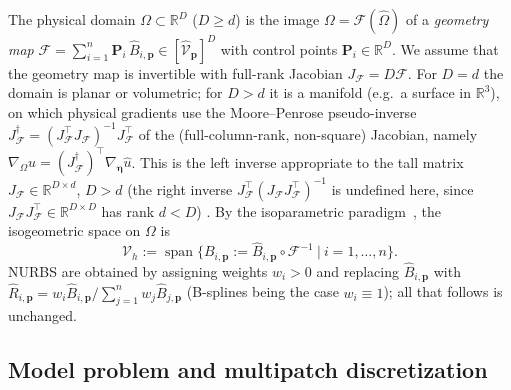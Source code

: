 \documentclass{article}
\newcommand{\mg}[1]{\todo[color=green!20]{\textbf{MG:} #1}}
\newcommand{\vect}[1]{\boldsymbol{#1}}
\newcommand{\R}{\mathbb{R}}
\DeclareMathOperator{\spann}{span}
\newcommand{\refdom}{\widehat{\Omega}}            %
\newcommand{\Bref}[2]{\widehat{B}_{#1,#2}}       %
\newcommand{\Bphy}[2]{B_{#1,#2}}                  %
\newcommand{\Rnurbs}[2]{\widehat{R}_{#1,#2}}     %
\newcommand{\Shat}[1]{\widehat{\mathcal{V}}_{#1}} %
\newcommand{\Vglo}{\mathcal{V}_h}                  %
\newcommand{\gmap}{\mathcal{F}}                   %
\theoremstyle{plain}
\numberwithin{equation}{section}
\begin{document}
The physical domain $\Omega \subset \R^{D}$ ($D \ge d$) is the image
$\Omega = \gmap(\refdom)$ of a \emph{geometry map}
$\gmap = \sum_{i=1}^{n} \vect{P}_i\, \Bref{i}{\vect{p}} \in
    [\Shat{\vect{p}}]^{D}$ with control points $\vect{P}_i \in \R^{D}$.
We assume that the geometry map is invertible with full-rank Jacobian $J_{\gmap} = D\gmap$.
For $D = d$ the domain is planar or volumetric; for $D > d$ it is a manifold (e.g.\ a
surface in $\R^3$), on which physical gradients use the Moore--Penrose
pseudo-inverse $J_{\gmap}^{\dagger} = (J_{\gmap}^{\top} J_{\gmap})^{-1}
    J_{\gmap}^{\top}$ of the (full-column-rank, non-square) Jacobian, namely
$\nabla_\Omega u=(J_{\gmap}^{\dagger})^\top\nabla_{\vect\eta}\widehat u$.
This is the left inverse appropriate to the tall matrix
$J_{\gmap}\in\R^{D\times d}$, $D>d$
(the right inverse $J_{\gmap}^{\top}(J_{\gmap}J_{\gmap}^{\top})^{-1}$ is undefined
here, since $J_{\gmap}J_{\gmap}^{\top}\in\R^{D\times D}$ has rank $d<D$) \mg{Check this}.
By the isoparametric paradigm~\cite{hughes2005isogeometric}, the isogeometric
space on $\Omega$ is
\begin{equation}
    \Vglo := \spann\bigl\{ \Bphy{i}{\vect{p}} := \Bref{i}{\vect{p}} \circ
    \gmap^{-1} \ \big|\ i = 1, \dots, n \bigr\}.
    \label{eq:isogeometric-space}
\end{equation}
NURBS are obtained by assigning weights $w_i > 0$ and replacing
$\Bref{i}{\vect{p}}$ with $\Rnurbs{i}{\vect{p}} = w_i
    \Bref{i}{\vect{p}} / \sum_{j=1}^n w_j \Bref{j}{\vect{p}}$ (B-splines
being the case $w_i \equiv 1$); all that follows is unchanged.

\subsection{Model problem and multipatch discretization} \label{subsec:model}
\end{document}
